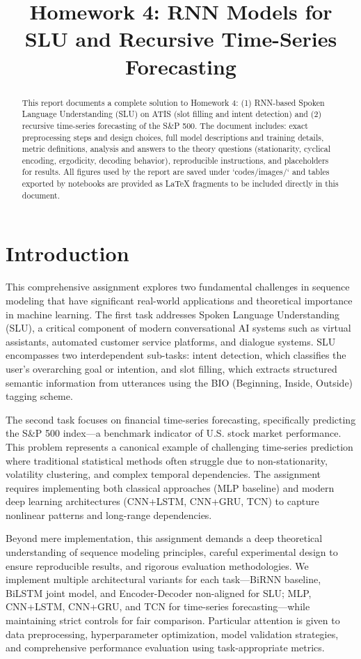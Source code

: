 \documentclass[conference]{IEEEtran}
\title{Homework 4: RNN Models for SLU and Recursive Time-Series Forecasting}
\author{\IEEEauthorblockN{Taha Majlesi - 810101504}
\IEEEauthorblockA{Department of Electrical and Computer Engineering\\
University of Tehran\\
Email: student@example.com}
}
\begin{document}
\maketitle
\begin{abstract}
This report documents a complete solution to Homework 4: (1) RNN-based Spoken Language Understanding (SLU) on ATIS (slot filling and intent detection) and (2) recursive time-series forecasting of the S\&P 500. The document includes: exact preprocessing steps and design choices, full model descriptions and training details, metric definitions, analysis and answers to the theory questions (stationarity, cyclical encoding, ergodicity, decoding behavior), reproducible instructions, and placeholders for results. All figures used by the report are saved under `codes/images/` and tables exported by notebooks are provided as LaTeX fragments to be included directly in this document.
\end{abstract}

\section{Introduction}

This comprehensive assignment explores two fundamental challenges in sequence modeling that have significant real-world applications and theoretical importance in machine learning. The first task addresses Spoken Language Understanding (SLU), a critical component of modern conversational AI systems such as virtual assistants, automated customer service platforms, and dialogue systems. SLU encompasses two interdependent sub-tasks: intent detection, which classifies the user's overarching goal or intention, and slot filling, which extracts structured semantic information from utterances using the BIO (Beginning, Inside, Outside) tagging scheme.

The second task focuses on financial time-series forecasting, specifically predicting the S\&P 500 index—a benchmark indicator of U.S. stock market performance. This problem represents a canonical example of challenging time-series prediction where traditional statistical methods often struggle due to non-stationarity, volatility clustering, and complex temporal dependencies. The assignment requires implementing both classical approaches (MLP baseline) and modern deep learning architectures (CNN+LSTM, CNN+GRU, TCN) to capture nonlinear patterns and long-range dependencies.

Beyond mere implementation, this assignment demands a deep theoretical understanding of sequence modeling principles, careful experimental design to ensure reproducible results, and rigorous evaluation methodologies. We implement multiple architectural variants for each task—BiRNN baseline, BiLSTM joint model, and Encoder-Decoder non-aligned for SLU; MLP, CNN+LSTM, CNN+GRU, and TCN for time-series forecasting—while maintaining strict controls for fair comparison. Particular attention is given to data preprocessing, hyperparameter optimization, model validation strategies, and comprehensive performance evaluation using task-appropriate metrics.
\end{document}
